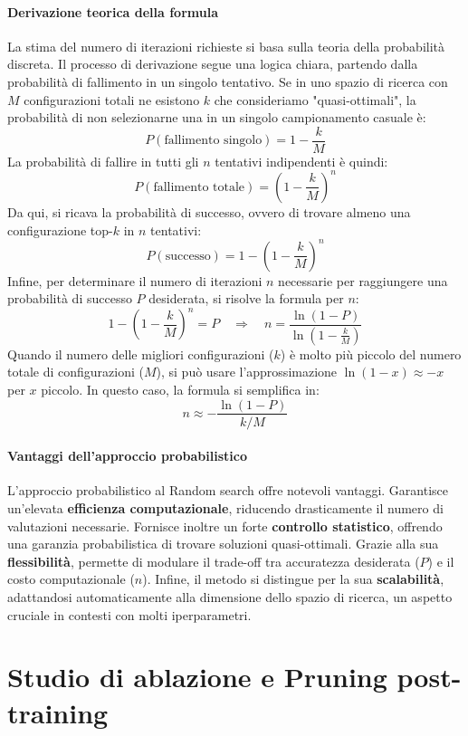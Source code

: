 \documentclass[a4paper,12pt]{report}
\begin{document}
	\subsubsection{Derivazione teorica della formula}
	La stima del numero di iterazioni richieste si basa sulla teoria della probabilità discreta. Il processo di derivazione segue una logica chiara, partendo dalla probabilità di fallimento in un singolo tentativo. Se in uno spazio di ricerca con $M$ configurazioni totali ne esistono $k$ che consideriamo "quasi-ottimali", la probabilità di non selezionarne una in un singolo campionamento casuale è:
	$$P(\text{fallimento singolo}) = 1 - \frac{k}{M}$$
	La probabilità di fallire in tutti gli $n$ tentativi indipendenti è quindi:
	$$P(\text{fallimento totale}) = \left(1 - \frac{k}{M}\right)^n$$
	Da qui, si ricava la probabilità di successo, ovvero di trovare almeno una configurazione top-$k$ in $n$ tentativi:
	$$P(\text{successo}) = 1 - \left(1 - \frac{k}{M}\right)^n$$
	Infine, per determinare il numero di iterazioni $n$ necessarie per raggiungere una probabilità di successo $P$ desiderata, si risolve la formula per $n$:
	$$1 - \left(1 - \frac{k}{M} \right)^n = P \quad \Longrightarrow \quad n = \frac{\ln(1 - P)}{\ln\left(1 - \frac{k}{M} \right)}$$
	Quando il numero delle migliori configurazioni ($k$) è molto più piccolo del numero totale di configurazioni ($M$), si può usare l'approssimazione $\ln(1 - x) \approx -x$ per $x$ piccolo. In questo caso, la formula si semplifica in:
	$$n \approx - \frac{\ln(1 - P)}{k/M}$$
	
	\subsubsection{Vantaggi dell'approccio probabilistico}
	L'approccio probabilistico al Random search offre notevoli vantaggi. Garantisce un'elevata \textbf{efficienza computazionale}, riducendo drasticamente il numero di valutazioni necessarie. Fornisce inoltre un forte \textbf{controllo statistico}, offrendo una garanzia probabilistica di trovare soluzioni quasi-ottimali. Grazie alla sua \textbf{flessibilità}, permette di modulare il trade-off tra accuratezza desiderata ($P$) e il costo computazionale ($n$). Infine, il metodo si distingue per la sua \textbf{scalabilità}, adattandosi automaticamente alla dimensione dello spazio di ricerca, un aspetto cruciale in contesti con molti iperparametri.
	
	\chapter{Studio di ablazione e Pruning post-training}
	
\end{document}
